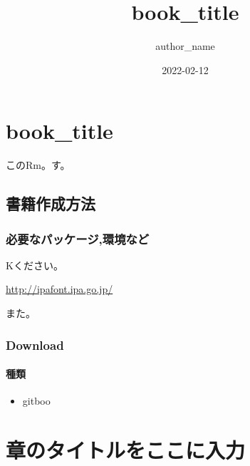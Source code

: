 \documentclass[
]{book}
\title{book\_title}
\author{author\_name}
\date{2022-02-12}
\providecommand{\tightlist}{%
  \setlength{\itemsep}{0pt}\setlength{\parskip}{0pt}}
\begin{document}
\maketitle

{
\setcounter{tocdepth}{1}
\tableofcontents
}
\hypertarget{book_title}{%
\chapter{book\_title}\label{book_title}}

このRm。す。

\hypertarget{ux66f8ux7c4dux4f5cux6210ux65b9ux6cd5}{%
\section{書籍作成方法}\label{ux66f8ux7c4dux4f5cux6210ux65b9ux6cd5}}

\hypertarget{ux5fc5ux8981ux306aux30d1ux30c3ux30b1ux30fcux30b8ux74b0ux5883ux306aux3069}{%
\subsection{必要なパッケージ,環境など}\label{ux5fc5ux8981ux306aux30d1ux30c3ux30b1ux30fcux30b8ux74b0ux5883ux306aux3069}}

Kください。

\url{http://ipafont.ipa.go.jp/}

また。

\hypertarget{download}{%
\subsection{Download}\label{download}}

\hypertarget{ux7a2eux985e}{%
\subsubsection{種類}\label{ux7a2eux985e}}

\begin{itemize}
\tightlist
\item
  gitboo
\end{itemize}

\hypertarget{ux7ae0ux306eux30bfux30a4ux30c8ux30ebux3092ux3053ux3053ux306bux5165ux529b}{%
\chapter{章のタイトルをここに入力}\label{ux7ae0ux306eux30bfux30a4ux30c8ux30ebux3092ux3053ux3053ux306bux5165ux529b}}
\end{document}
